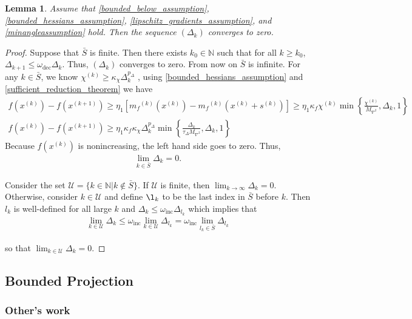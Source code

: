 \documentclass{article}
\newtheorem{lemma}[theorem]{Lemma}
\theoremstyle{case}
\numberwithin{theorem}{subsection}
\newcommand{\chik}{{\chi^{(k)}}}
\newcommand{\dk}{\Delta_k}
\newcommand{\dkpo}{\Delta_{k+1}}
\newcommand{\maxhessian}{{M_{\nabla^2}}}
\newcommand{\mfk}{{{m}_f}^{(k)}}
\newcommand{\naturals}{\mathbb N}
\newcommand{\oalpha}{\tau_{\Delta}}
\newcommand{\omegadec}{\omega_{\text{dec}}}
\newcommand{\omegainc}{\omega_{\text{inc}}}
\newcommand{\sk}{{{s}^{(k)}}}
\newcommand{\xkpo}{{{x}^{(k+1)}}}
\newcommand{\xk}{{x^{(k)}}}
\begin{document}
\begin{lemma}
\label{delta_to_zero}
Assume that
\cref{bounded_below_assumption},
\cref{bounded_hessians_assumption},
\cref{lipschitz_gradients_assumption},
and \cref{minangleassumption} hold.
Then the sequence $(\dk)$ converges to zero.
\end{lemma}
 

\begin{proof}

Suppose that $\bar{S}$ is finite. Then there exists $k_0 \in \naturals$ such that for all $k \ge  k_0$, $\dkpo \le \omegadec \dk$.
Thus, $(\dk)$ converges to zero.
From now on $\bar{S}$ is infinite.  
For any $k \in \bar{S}$, we know $\chik \ge \kappa_{\chi}\dk^{p_{\Delta}}$ , using \cref{bounded_hessians_assumption} and \cref{sufficient_reduction_theorem} we have
\begin{align*}
f\left(\xk\right) - f\left(\xkpo\right) \ge \eta_1 \left[\mfk\left(\xk\right) - \mfk\left(\xk + \sk\right)\right] \ge \eta_1 \kappa_f \chik \min\left\{\frac{\chik}{\maxhessian}, \dk, 1\right\}\\
f\left(\xk\right) - f\left(\xkpo\right) \ge \eta_1\kappa_f \kappa_{\chi}\dk^{p_{\Delta}}\min\left\{\frac{\dk}{\oalpha \maxhessian}, \dk, 1\right\}
\end{align*}
Because $f\left(\xk\right)$ is nonincreasing, the left hand side goes to zero.
Thus,
\begin{align}
\lim_{k \in \bar{S}} \dk = 0.
\end{align}

Consider the set
$\mathcal U = \{ k \in \naturals | k \not \in \bar S \}$.
If $\mathcal U$ is finite, then $\lim_{k\to\infty}\dk = 0$.
Otherwise, consider $k \in \mathcal U$ and define $\l_k$ to be the last index in $\bar S$ before $k$.
Then $l_k$ is well-defined for all large $k$  and $\dk \le \omegainc \Delta_{l_k}$ which implies that
\begin{align}
\lim_{k \in \mathcal U } \dk \le \omegainc \lim_{k \in \mathcal U} \Delta_{l_k} = \omegainc \lim_{l_k \in \bar{S}} \Delta_{l_k}
\end{align}

so that $\lim_{k \in \mathcal U} \dk = 0$.
\end{proof}

\subsection{Bounded Projection}

\subsubsection{Other's work}
\end{document}
